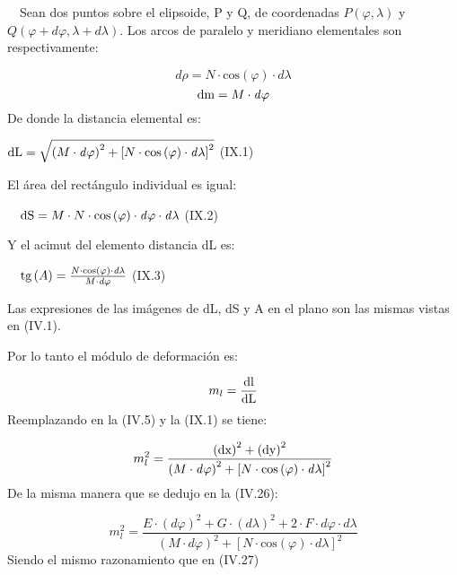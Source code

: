 \documentclass{tufte-book}
\newcommand\normalsubformula[1]{\text{\mathversion{normal}$#1$}}
\begin{document}
\ \ Sean dos puntos sobre el elipsoide, P y Q, de coordenadas 
${P(\varphi ,\lambda )}$ y  ${Q(\varphi +\mathit{d\varphi },\lambda
+\mathit{d\lambda })}$. Los arcos de paralelo y meridiano elementales
son respectivamente: 

\begin{equation*}
{\mathit{d\rho }=N\cdot \text{cos}\left(\varphi \right)\cdot
\mathit{d\lambda }}
\end{equation*}
\begin{equation*}
{\normalsubformula{\text{dm}}=M\cdot \mathit{d\varphi }}
\end{equation*}
De donde la distancia elemental es:

 ${\normalsubformula{\text{dL}}=\sqrt{\left(M\cdot \mathit{d\varphi
}\right)^{{2}}+\left[N\cdot \text{cos}\left(\varphi \right)\cdot
\mathit{d\lambda }\right]^{{2}}}}$  (IX.1)

El área del rectángulo individual es igual:

\ \  ${\normalsubformula{\text{dS}}=M\cdot N\cdot
\text{cos}\left(\varphi \right)\cdot \mathit{d\varphi }\cdot
\mathit{d\lambda }}$  (IX.2)

Y el acimut del elemento distancia dL es:

\ \  ${\normalsubformula{\text{tg}}\left(A\right)=\frac{N\cdot
\text{cos}\left(\varphi \right)\cdot \mathit{d\lambda }}{M\cdot
\mathit{d\varphi }}}$  (IX.3)

Las expresiones de las imágenes de dL, dS y A en el plano son las
mismas vistas en (IV.1).

Por lo tanto el módulo de deformación es:

\begin{equation*}
{m_{{l}}=\frac{\normalsubformula{\text{dl}}}{\normalsubformula{\text{dL}}}}
\end{equation*}
Reemplazando en la (IV.5) y la (IX.1) se tiene:

\begin{equation*}
{m_{{l}}^{{2}}=\frac{\left(\normalsubformula{\text{dx}}\right)^{{2}}+\left(\normalsubformula{\text{dy}}\right)^{{2}}}{\left(M\cdot
\mathit{d\varphi }\right)^{{2}}+\left[N\cdot \text{cos}\left(\varphi
\right)\cdot \mathit{d\lambda }\right]^{{2}}}}
\end{equation*}
De la misma manera que se dedujo en la (IV.26):

\begin{equation*}
{m_{{l}}^{{2}}=\frac{E\cdot \left(\mathit{d\varphi }\right)^{{2}}+G\cdot
\left(\mathit{d\lambda }\right)^{{2}}+2\cdot F\cdot \mathit{d\varphi
}\cdot \mathit{d\lambda }}{\left(M\cdot \mathit{d\varphi
}\right)^{{2}}+\left[N\cdot \text{cos}\left(\varphi \right)\cdot
\mathit{d\lambda }\right]^{{2}}}}
\end{equation*}
Siendo el mismo razonamiento que en (IV.27)
\end{document}
